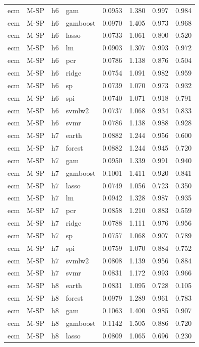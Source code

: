 \begin{ThreePartTable}
\begin{longtable}[t]{llclcccc}
ecm & M-SP & h6 & gam & 0.0953 & 1.380 & 0.997 & 0.984\\
ecm & M-SP & h6 & gamboost & 0.0970 & 1.405 & 0.973 & 0.968\\
ecm & M-SP & h6 & lasso & 0.0733 & 1.061 & 0.800 & 0.520\\
ecm & M-SP & h6 & lm & 0.0903 & 1.307 & 0.993 & 0.972\\
ecm & M-SP & h6 & pcr & 0.0786 & 1.138 & 0.876 & 0.504\\
ecm & M-SP & h6 & ridge & 0.0754 & 1.091 & 0.982 & 0.959\\
ecm & M-SP & h6 & sp & 0.0739 & 1.070 & 0.973 & 0.932\\
ecm & M-SP & h6 & spi & 0.0740 & 1.071 & 0.918 & 0.791\\
ecm & M-SP & h6 & svmlw2 & 0.0737 & 1.068 & 0.934 & 0.833\\
ecm & M-SP & h6 & svmr & 0.0786 & 1.138 & 0.988 & 0.928\\
\addlinespace
ecm & M-SP & h7 & earth & 0.0882 & 1.244 & 0.956 & 0.600\\
ecm & M-SP & h7 & forest & 0.0882 & 1.244 & 0.945 & 0.720\\
ecm & M-SP & h7 & gam & 0.0950 & 1.339 & 0.991 & 0.940\\
ecm & M-SP & h7 & gamboost & 0.1001 & 1.411 & 0.920 & 0.841\\
ecm & M-SP & h7 & lasso & 0.0749 & 1.056 & 0.723 & 0.350\\
ecm & M-SP & h7 & lm & 0.0942 & 1.328 & 0.987 & 0.935\\
ecm & M-SP & h7 & pcr & 0.0858 & 1.210 & 0.883 & 0.559\\
ecm & M-SP & h7 & ridge & 0.0788 & 1.111 & 0.976 & 0.956\\
ecm & M-SP & h7 & sp & 0.0757 & 1.068 & 0.907 & 0.789\\
ecm & M-SP & h7 & spi & 0.0759 & 1.070 & 0.884 & 0.752\\
ecm & M-SP & h7 & svmlw2 & 0.0808 & 1.139 & 0.956 & 0.884\\
ecm & M-SP & h7 & svmr & 0.0831 & 1.172 & 0.993 & 0.966\\
\addlinespace
ecm & M-SP & h8 & earth & 0.0831 & 1.095 & 0.728 & 0.105\\
ecm & M-SP & h8 & forest & 0.0979 & 1.289 & 0.961 & 0.783\\
ecm & M-SP & h8 & gam & 0.1063 & 1.400 & 0.985 & 0.907\\
ecm & M-SP & h8 & gamboost & 0.1142 & 1.505 & 0.886 & 0.720\\
ecm & M-SP & h8 & lasso & 0.0809 & 1.065 & 0.696 & 0.230\\

\end{longtable}
\end{ThreePartTable}
